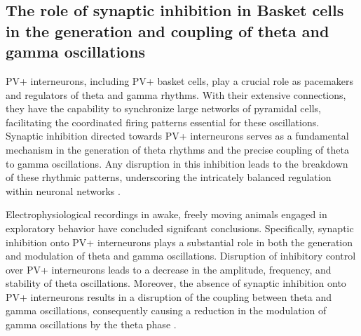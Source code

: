 \documentclass[../main.tex]{subfiles}
\begin{document}
\subsection{The role of synaptic inhibition in Basket cells in the generation and coupling of theta and gamma oscillations}
PV+ interneurons, including PV+ basket cells, play a crucial role as pacemakers and regulators of theta and gamma rhythms.
With their extensive connections, they have the capability to synchronize large networks of pyramidal cells, facilitating the coordinated firing patterns essential for these oscillations.
Synaptic inhibition directed towards PV+ interneurons serves as a fundamental mechanism in the generation of theta rhythms and the precise coupling of theta to gamma oscillations.
Any disruption in this inhibition leads to the breakdown of these rhythmic patterns, underscoring the intricately balanced regulation within neuronal networks \citep{wulff_hippocampal_2009}.

Electrophysiological recordings in awake, freely moving animals engaged in exploratory behavior have concluded signifcant conclusions.
Specifically, synaptic inhibition onto PV+ interneurons plays a substantial role in both the generation and modulation of theta and gamma oscillations.
Disruption of inhibitory control over PV+ interneurons leads to a decrease in the amplitude, frequency, and stability of theta oscillations.
Moreover, the absence of synaptic inhibition onto PV+ interneurons results in a disruption of the coupling between theta and gamma oscillations, consequently causing a reduction in the modulation of gamma oscillations by the theta phase \citep{wulff_hippocampal_2009}.
\end{document}
